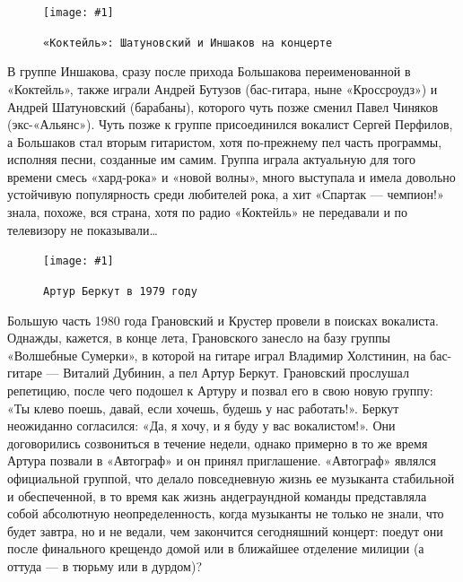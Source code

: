 \documentclass[16pt,a5paper]{book}
\newcommand{\myincludegraphics}[1]{\texttt{[image: \#1]}}
\begin{document}
\begin{figure}[h]
    \centering
    \myincludegraphics{Image06}
    \caption{\texttt{«Коктейль»: Шатуновский и Иншаков на концерте}}
\end{figure}

В группе Иншакова, сразу после прихода Большакова переименованной в «Коктейль», также играли Андрей Бутузов (бас-гитара,
ныне «Кроссроудз») и Андрей Шатуновский (барабаны), которого чуть позже сменил Павел Чиняков (экс-«Альянс»). Чуть позже
к группе присоединился вокалист Сергей Перфилов, а Большаков стал вторым гитаристом, хотя по-прежнему пел часть
программы, исполняя песни, созданные им самим. Группа играла актуальную для того времени смесь «хард-рока» и «новой
волны», много выступала и имела довольно устойчивую популярность среди любителей рока, а хит «Спартак — чемпион!» знала,
похоже, вся страна, хотя по радио «Коктейль» не передавали и по телевизору не показывали\ldots

\begin{figure}
    \centering
    \myincludegraphics{Image07}
    \caption{\texttt{Артур Беркут в 1979 году}}
\end{figure}

Большую часть 1980 года Грановский и Крустер провели в поисках вокалиста. Однажды, кажется, в конце лета, Грановского
занесло на базу группы «Волшебные Сумерки», в которой на гитаре играл Владимир Холстинин, на бас-гитаре — Виталий
Дубинин, а пел Артур Беркут. Грановский прослушал репетицию, после чего подошел к Артуру и позвал его в свою новую
группу: «Ты клево поешь, давай, если хочешь, будешь у нас работать!». Беркут неожиданно согласился: «Да, я хочу, и я
буду у вас вокалистом!». Они договорились созвониться в течение недели, однако примерно в то же время Артура позвали в
«Автограф» и он принял приглашение. «Автограф» являлся официальной группой, что делало повседневную жизнь ее музыканта
стабильной и обеспеченной, в то время как жизнь андеграундной команды представляла собой абсолютную неопределенность,
когда музыканты не только не знали, что будет завтра, но и не ведали, чем закончится сегодняшний концерт: поедут они
после финального крещендо домой или в ближайшее отделение милиции (а оттуда — в тюрьму или в дурдом)?
\end{document}
